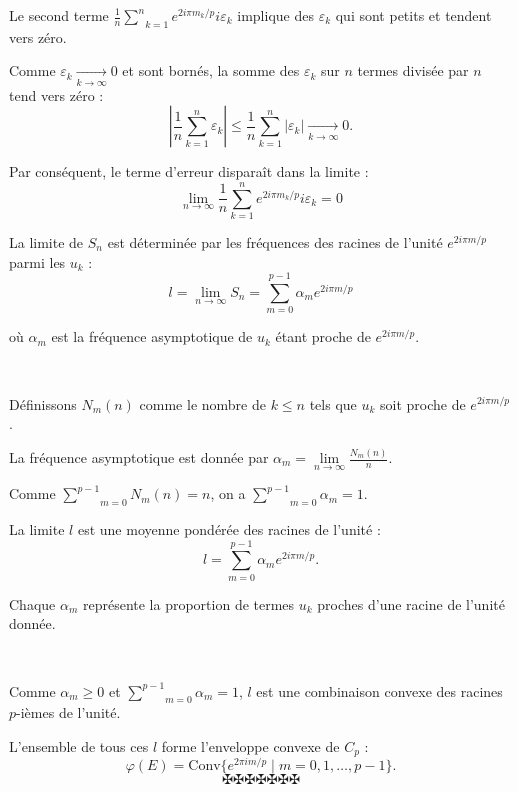 Le second terme $\frac{1}{n}  \underset{k = 1}{\overset{n}{\sum}} e^{2 i \pi
m_k / p} i \varepsilon_k$ implique des $\varepsilon_k$ qui sont petits et
tendent vers z{\'e}ro.

Comme $\varepsilon_k  \underset{k \to \infty}{\to} 0$ et sont born{\'e}s, la
somme des $\varepsilon_k$ sur $n$ termes divis{\'e}e par $n$ tend vers
z{\'e}ro :
\[ \left| \frac{1}{n}  \sum_{k = 1}^n \varepsilon_k \right| \leq \frac{1}{n} 
   \sum_{k = 1}^n | \varepsilon_k | \underset{k \to \infty}{\to} 0. \]


Par cons{\'e}quent, le terme d'erreur dispara{\^i}t dans la limite :
\[ \underset{n \to \infty}{\lim}   \frac{1}{n}  \sum_{k = 1}^n e^{2 i \pi m_k
   / p} i \varepsilon_k = 0 \]


La limite de $S_n$ est d{\'e}termin{\'e}e par les fr{\'e}quences des racines
de l'unit{\'e} $e^{2 i \pi m / p}$ parmi les $u_k$ :
\[ l = \underset{n \to \infty}{\lim} S_n = \sum_{m = 0}^{p - 1} \alpha_m e^{2
   i \pi m / p}  \]


o{\`u} $\alpha_m$ est la fr{\'e}quence asymptotique de $u_k$ {\'e}tant proche
de $e^{2 i \pi m / p}$.

\

D{\'e}finissons $N_m (n)$ comme le nombre de $k \leq n$ tels que $u_k$ soit
proche de $e^{2 i \pi m / p}$.

La fr{\'e}quence asymptotique est donn{\'e}e par $\alpha_m = \underset{n \to
\infty}{\lim}  \frac{N_m (n)}{n}$.

Comme $\underset{m = 0}{\overset{p - 1}{\sum}} N_m (n) = n$, on a
$\underset{m = 0}{\overset{p - 1}{\sum}} \alpha_m = 1$.

La limite $l$ est une moyenne pond{\'e}r{\'e}e des racines de l'unit{\'e} :
\[ l = \sum_{m = 0}^{p - 1} \alpha_m e^{2 i \pi m / p} . \]


Chaque $\alpha_m$ repr{\'e}sente la proportion de termes $u_k$ proches d'une
racine de l'unit{\'e} donn{\'e}e.

\

Comme $\alpha_m \geq 0$ et $\underset{m = 0}{\overset{p - 1}{\sum}} \alpha_m
= 1$, $l$ est une combinaison convexe des racines $p$-i{\`e}mes de
l'unit{\'e}. \

L'ensemble de tous ces $l$ forme l'enveloppe convexe de $C_p$ :
\[ \varphi (E) = \text{Conv} \{ e^{2 \pi im / p} \mid m = 0, 1, \ldots, p - 1
   \} . \]
\[ \maltese \maltese \maltese \maltese \maltese \maltese \maltese \]
